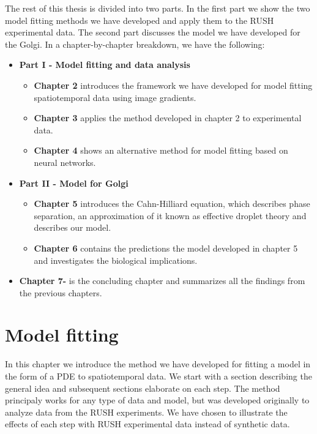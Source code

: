 \documentclass[12pt,a4paper,]{Dissertate}
\providecommand{\tightlist}{%
  \setlength{\itemsep}{0pt}\setlength{\parskip}{0pt}}
\begin{document}
The rest of this thesis is divided into two parts. In the first part we
show the two model fitting methods we have developed and apply them to
the RUSH experimental data. The second part discusses the model we have
developed for the Golgi. In a chapter-by-chapter breakdown, we have the
following:

\begin{itemize}
\tightlist
\item
  \textbf{Part I - Model fitting and data analysis}

  \begin{itemize}
  \tightlist
  \item
    \textbf{Chapter 2} introduces the framework we have developed for
    model fitting spatiotemporal data using image gradients.
  \item
    \textbf{Chapter 3} applies the method developed in chapter 2 to
    experimental data.
  \item
    \textbf{Chapter 4} shows an alternative method for model fitting
    based on neural networks.
  \end{itemize}
\item
  \textbf{Part II - Model for Golgi }

  \begin{itemize}
  \tightlist
  \item
    \textbf{Chapter 5} introduces the Cahn-Hilliard equation, which
    describes phase separation, an approximation of it known as
    effective droplet theory and describes our model.
  \item
    \textbf{Chapter 6} contains the predictions the model developed in
    chapter 5 and investigates the biological implications.
  \end{itemize}
\item
  \textbf{Chapter 7-} is the concluding chapter and summarizes all the
  findings from the previous chapters.
\end{itemize}

\hypertarget{model-fitting}{%
\chapter{Model fitting}\label{model-fitting}}

In this chapter we introduce the method we have developed for fitting a
model in the form of a PDE to spatiotemporal data. We start with a
section describing the general idea and subsequent sections elaborate on
each step. The method principaly works for any type of data and model,
but was developed originally to analyze data from the RUSH experiments.
We have chosen to illustrate the effects of each step with RUSH
experimental data instead of synthetic data.
\end{document}
